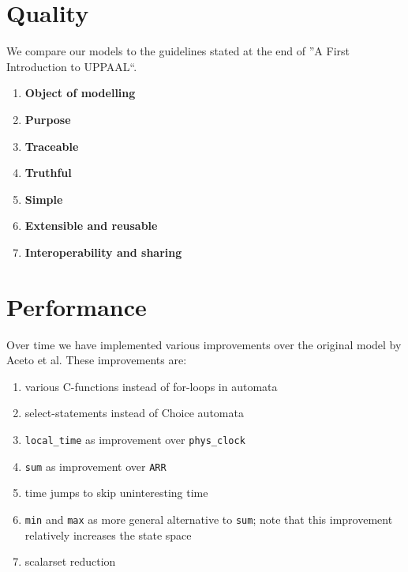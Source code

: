 \documentclass[a4paper,10pt]{article}
\begin{document}
\section{Quality\label{sec:quality}}


We compare our models to the guidelines stated at the end of ''A First Introduction to UPPAAL``. \cite{Vaandrager2011First}

\begin{enumerate}
\item \textbf{Object of modelling} \\
\item \textbf{Purpose} \\
\item \textbf{Traceable} \\
\item \textbf{Truthful} \\
\item \textbf{Simple} \\
\item \textbf{Extensible and reusable} \\
\item \textbf{Interoperability and sharing} \\
\end{enumerate}

\section{Performance\label{sec:performance}}


Over time we have implemented various improvements over the original model by Aceto et al. These improvements are:

\begin{enumerate}
\item various C-functions instead of for-loops in automata
\item select-statements instead of Choice automata
\item \texttt{local\_time} as improvement over \texttt{phys\_clock}
\item \texttt{sum} as improvement over \texttt{ARR}
\item time jumps to skip uninteresting time
\item \texttt{min} and \texttt{max} as more general alternative to \texttt{sum}; note that this improvement relatively increases the state space
\item scalarset reduction
\end{enumerate}
\end{document}
